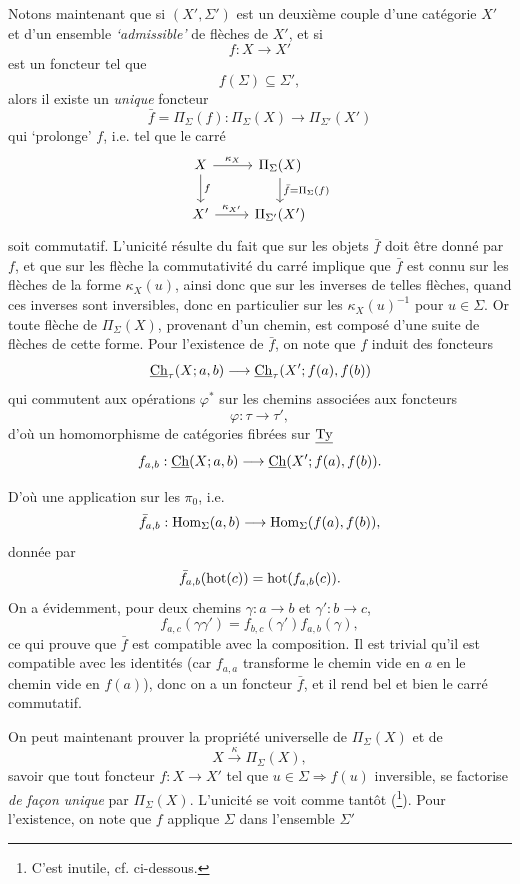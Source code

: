 Notons maintenant que si $(X', \Sigma')$ est un deuxième couple d'une catégorie $X'$ et d'un ensemble \textit{`admissible'} de flèches de $X'$, et si
\[
f : X \longrightarrow X'
\]
est un foncteur tel que
\[
f(\Sigma) \subseteq \Sigma',
\]
alors il existe un \textit{unique} foncteur
\[
\bar{f} = \Pi_\Sigma(f) : \Pi_\Sigma(X) \longrightarrow \Pi_{\Sigma'}(X')
\]
qui `prolonge' $f$, i.e. tel que le carré
\[
\begin{tikzcd}
X \arrow[r, "\kappa_X"] \arrow[d, "{\scriptstyle f}"] & \Pi_\Sigma(X) \arrow[d, "{\scriptstyle \bar{f} = \Pi_\Sigma(f)}"] \\
X' \arrow[r, "\kappa_{X'}"] & \Pi_{\Sigma'}(X')
\end{tikzcd}
\]
soit commutatif. L'unicité résulte du fait que sur les objets $\bar{f}$ doit être donné par $f$, et que sur les flèche la commutativité du carré implique que $\bar{f}$ est connu sur les flèches de la forme $\kappa_X(u)$, ainsi donc que sur les inverses de telles flèches, quand ces inverses sont inversibles, donc en particulier sur les $\kappa_X(u)^{-1}$ pour $u \in \Sigma$. Or toute flèche de $\Pi_\Sigma(X)$, provenant d'un chemin, est composé d'une suite de flèches de cette forme. Pour l'existence de $\bar{f}$, on note que $f$ induit des foncteurs %
\[
\underline{\mathrm{Ch}}_\tau(X; a, b) \longrightarrow \underline{\mathrm{Ch}}_\tau(X'; f(a), f(b))
\]
qui commutent aux opérations $\varphi^*$ sur les chemins associées aux foncteurs
\[
\varphi : \tau \longrightarrow \tau',
\]
d'où un homomorphisme de catégories fibrées sur $\underline{\mathrm{Ty}}$
\[
f_{a,b} : \underline{\mathrm{Ch}}(X; a, b) \longrightarrow \underline{\mathrm{Ch}}(X'; f(a), f(b)).
\]


D'où une application sur les $\pi_0$, i.e.
\[
\bar{f}_{a,b} : \mathrm{Hom}_\Sigma(a,b) \longrightarrow \mathrm{Hom}_\Sigma(f(a), f(b)),
\]
donnée par
\[
\bar{f}_{a,b}(\mathrm{hot}(c)) = \mathrm{hot}(f_{a,b}(c)).
\]
On a évidemment, pour deux chemins $\gamma : a \longrightarrow b$ et $\gamma' : b \longrightarrow c$,
\[
f_{a,c}(\gamma\gamma') = f_{b,c}(\gamma')f_{a,b}(\gamma),
\]
ce qui prouve que $\bar{f}$ est compatible avec la composition. Il est trivial qu'il est compatible avec les identités (car $f_{a,a}$ transforme le chemin vide en $a$ en le chemin vide en $f(a)$), donc on a un foncteur $\bar{f}$, et il rend bel et bien le carré commutatif.

On peut maintenant prouver la propriété universelle de $\Pi_\Sigma(X)$ et de
\[
X \xrightarrow{\ \kappa\ } \Pi_\Sigma(X),
\]
savoir que tout foncteur $f : X \longrightarrow X'$ tel que $u \in \Sigma \Longrightarrow f(u)$ inversible, se factorise \textit{de façon unique} par $\Pi_\Sigma(X)$. L'unicité se voit comme tantôt (\footnote[20]{C'est inutile, cf. ci-dessous.}). Pour l'existence, on note que $f$ applique $\Sigma$ dans l'ensemble $\Sigma'$


